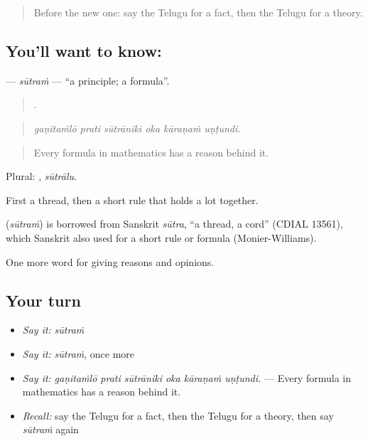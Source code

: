 \label{lesson:TE-C390-sutram}



\begin{quote}
Before the new one: say the Telugu for a fact, then the Telugu for a theory.
\end{quote}

\subsection*{You'll want to know: }
\textbf{} — \emph{sūtraṁ} — \textquotedblleft{}a principle; a formula\textquotedblright{}.

\begin{quote}
     .
\end{quote}

\begin{quote}
\emph{gaṇitaṁlō prati sūtrāniki oka kāraṇaṁ uṇṭundi.}
\end{quote}

\begin{quote}
Every formula in mathematics has a reason behind it.
\end{quote}

Plural: , \emph{sūtrālu}.

First a thread, then a short rule that holds a lot together.

\begin{cousinweb}
\textbf{} (\emph{sūtraṁ}) is borrowed from Sanskrit \emph{sūtra}, \textquotedblleft{}a thread, a cord\textquotedblright{} (CDIAL 13561), which Sanskrit also used for a short rule or formula (Monier-Williams).
\end{cousinweb}

\begin{grammarlens}[title={What you've built}]
One more word for giving reasons and opinions.
\end{grammarlens}

\subsection*{Your turn}
\begin{itemize}
\raggedright
  \item \emph{Say it:} \emph{sūtraṁ}
  \item \emph{Say it:} \emph{sūtraṁ}, once more
  \item \emph{Say it:} \emph{gaṇitaṁlō prati sūtrāniki oka kāraṇaṁ uṇṭundi.} — Every formula in mathematics has a reason behind it.
  \item \emph{Recall:} say the Telugu for a fact, then the Telugu for a theory, then say \emph{sūtraṁ} again
\end{itemize}

